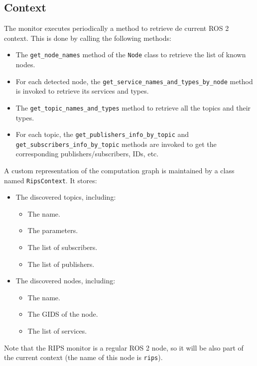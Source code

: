 \documentclass[a4paper]{article}
\begin{document}
\subsection{Context}

The monitor executes periodically a method to retrieve de current
ROS 2 context. This is done by calling the following methods:

\begin{itemize}
	\item  The \texttt{get\_node\_names}
	method of the \texttt{Node} class to retrieve the list
	of known nodes.

	\item For each detected node, the \texttt{get\_service\_names\_and\_types\_by\_node}
	method is invoked to retrieve its services and types.

	\item The \texttt{get\_topic\_names\_and\_types} method to
	retrieve all the topics and their types.

	\item For each topic, the \texttt{get\_publishers\_info\_by\_topic} and
	\texttt{get\_subscribers\_info\_by\_topic} methods are invoked to get
	the corresponding publishers/subscribers, IDs, etc.
\end{itemize}

A custom representation of the computation
graph is maintained by a class named \texttt{RipsContext}.
It stores:
\begin{itemize}
	\item The discovered topics, including:
	\begin{itemize}
		\item The name.
		\item The parameters.
		\item The list of subscribers.
		\item The list of publishers.
	\end{itemize}
	\item The discovered nodes, including:
	\begin{itemize}
		\item The name.
		\item The GIDS of the node.
		\item The list of services.
	\end{itemize}
\end{itemize}

Note that the RIPS monitor is a regular ROS 2 node, so it will be also
part of the current context (the name of this node is \texttt{rips}).
\end{document}
